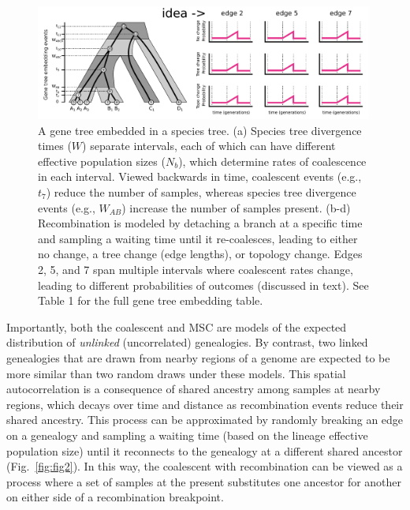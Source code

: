 \documentclass[11pt]{article}
\begin{document}
\begin{figure}
	\centering
	\includegraphics[width=0.99\textwidth]{figures/Fig3-parameters-extend.pdf}
	\caption{A gene tree embedded in a species tree. 
	(a) Species tree divergence times ($W$) separate
	intervals, each of which can have different effective population sizes ($N_b$),
	which determine rates of coalescence in each interval. Viewed backwards in time, 
	coalescent events (e.g., $t_7$) reduce the number of samples, whereas species tree
	divergence events (e.g., $W_{AB}$) increase the number of samples present. 
	(b-d) Recombination is modeled by detaching a branch at a specific time and 
	sampling a waiting time until it re-coalesces, leading to either no change, 
	a tree change (edge lengths), or topology change. Edges 2, 5, and 7 span multiple
	intervals where coalescent rates change, leading to different probabilities of
	outcomes (discussed in text). See Table 1 for the full gene tree embedding table.
	}
	\label{fig:fig1}
\end{figure}


Importantly, both the coalescent and MSC are models of the expected distribution of 
\emph{unlinked} (uncorrelated) genealogies.
By contrast, two linked genealogies that are drawn from nearby regions of a genome %
are expected to be more similar than two random draws under these models. This spatial 
autocorrelation is a consequence of shared ancestry among samples at nearby regions, 
which decays over time and distance as recombination events reduce their shared ancestry.
This process can be approximated by randomly breaking an edge on a genealogy and sampling
a waiting time (based on the lineage effective population size) until it reconnects
to the genealogy at a different shared ancestor (Fig.~\ref{fig:fig2}). 
In this way, the coalescent with recombination can be viewed as a process 
where a set of samples at the present substitutes one ancestor for another on 
either side of a recombination breakpoint. 
\end{document}
